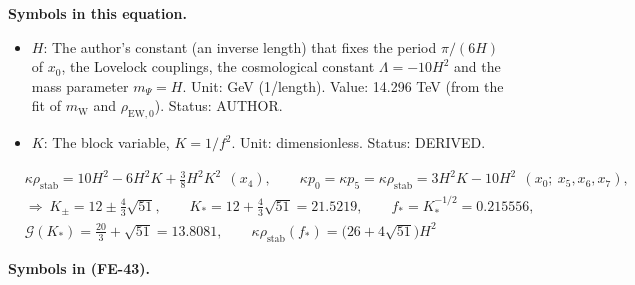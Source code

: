 \documentclass[
  10pt,
]{article}
\providecommand{\tightlist}{%
  \setlength{\itemsep}{0pt}\setlength{\parskip}{0pt}}
\begin{document}
\textbf{Symbols in this equation.}

\begin{itemize}
\tightlist
\item
  \(H\): The author's constant (an inverse length) that fixes the period
  \(\pi/(6H)\) of \(x_0\), the Lovelock couplings, the cosmological
  constant \(\Lambda = -10H^2\) and the mass parameter \(m_\Psi = H\).
  Unit: GeV (1/length). Value: 14.296 TeV (from the fit of
  \(m_{\mathrm{W}}\) and \(\rho_{\mathrm{EW},0}\)). Status: AUTHOR.
\item
  \(K\): The block variable, \(K = 1/f^2\). Unit: dimensionless. Status:
  DERIVED.
\end{itemize}

\[
\begin{aligned}
&\kappa\rho_{\mathrm{stab}} = 10H^2 - 6H^2K + \tfrac38H^2K^2\ \ (x_4),\qquad
 \kappa p_0 = \kappa p_5 = \kappa\rho_{\mathrm{stab}} = 3H^2K - 10H^2\ \ (x_0;\ x_5, x_6, x_7),\\
&\Rightarrow\ K_{\pm} = 12 \pm \tfrac43\sqrt{51},\qquad
K_* = 12 + \tfrac43\sqrt{51} = 21.5219,\qquad f_* = K_*^{-1/2} = 0.215556,\\
&\mathcal{G}(K_*) = \tfrac{20}{3} + \sqrt{51} = 13.8081,\qquad \kappa\rho_{\mathrm{stab}}(f_*) = \big(26
 + 4\sqrt{51}\big)H^2
\end{aligned} \tag{FE-43}
\]

\textbf{Symbols in (FE-43).}
\end{document}
